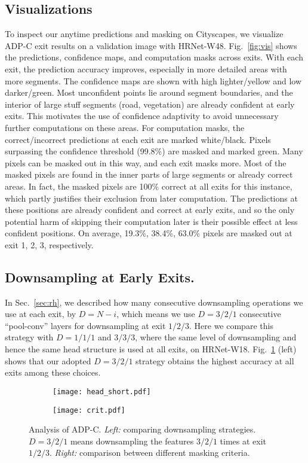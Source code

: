 \subsection{Visualizations} 
To inspect our anytime predictions and masking on Cityscapes, we visualize ADP-C exit results on a validation image with HRNet-W48.
Fig.~\ref{fig:vis} shows the predictions, confidence maps, and computation masks across exits.
With each exit, the prediction accuracy improves, especially in more detailed areas with more segments.
The confidence maps are shown with high lighter/yellow and low darker/green.
Most unconfident points lie around segment boundaries, and the interior of large stuff segments (road, vegetation) are already confident at early exits.
This motivates the use of confidence adaptivity to avoid unnecessary further computations on these areas.
For computation masks, the correct/incorrect predictions at each exit are marked white/black.
Pixels surpassing the confidence threshold (99.8\%) are masked and marked green.
Many pixels can be masked out in this way, and each exit masks more.
Most of the masked pixels are found in the inner parts of large segments or already correct areas.
In fact, the masked pixels are 100\% correct at all exits for this instance, which partly justifies their exclusion from later computation.
The predictions at these positions are already confident and correct at early exits, and so the only potential harm of skipping their computation later is their possible effect at less confident positions.
On average, 19.3\%, 38.4\%, 63.0\% pixels are masked out at exit 1, 2, 3, respectively.



\subsection{Downsampling at Early Exits.}
In Sec.~\ref{sec:rh}, we described how many consecutive downsampling operations we use at each exit, by $D = N -i$, which means we use $D=3/2/1$ consecutive ``pool-conv'' layers for downsampling at exit $1/2/3$.
Here we compare this strategy with $D=1/1/1$ and $3/3/3$, where the same level of downsampling and hence the same head structure is used at all exits, on HRNet-W18. 
Fig.~\ref{fig:twofigs} (left) shows that our adopted $D=3/2/1$ strategy obtains the highest accuracy at all exits among these choices.


\begin{figure}[htbp]
\centering
   \begin{subfigure}{0.45\linewidth} \centering
     \texttt{[image: head\_short.pdf]}
   \end{subfigure}
   \begin{subfigure}{0.45\linewidth} \centering
     \texttt{[image: crit.pdf]}
   \end{subfigure}
\caption{Analysis of ADP-C. \emph{Left:} comparing downsampling strategies. $D=3/2/1$ means downsampling the features $3/2/1$ times at exit $1/2/3$. \emph{Right:} comparison between different masking criteria.} 
\label{fig:twofigs}
\end{figure}

